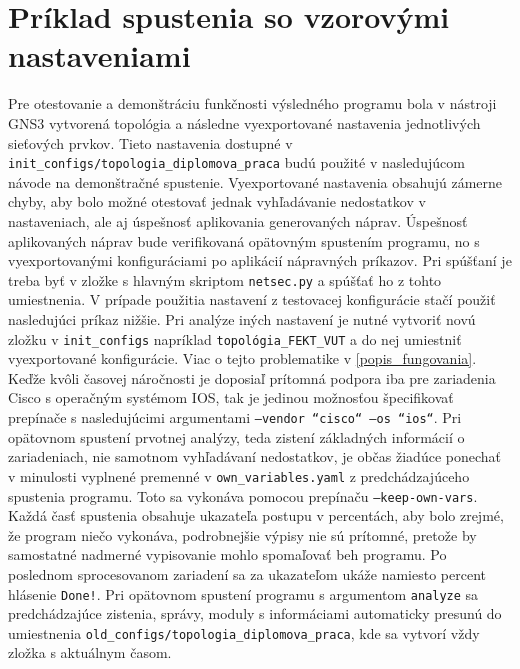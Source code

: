 \section{Príklad spustenia so vzorovými nastaveniami}
Pre otestovanie a demonštráciu funkčnosti výsledného programu bola v nástroji GNS3 vytvorená topológia a následne vyexportované nastavenia jednotlivých sieťových prvkov. Tieto nastavenia dostupné v \texttt{init\_configs/topologia\_diplomova\_praca} budú použité v nasledujúcom návode na demonštračné spustenie. Vyexportované nastavenia obsahujú zámerne chyby, aby bolo možné otestovať jednak vyhľadávanie nedostatkov v nastaveniach, ale aj úspešnosť aplikovania generovaných náprav. Úspešnosť aplikovaných náprav bude verifikovaná opätovným spustením programu, no s vyexportovanými konfiguráciami po aplikácií nápravných príkazov. Pri spúšťaní je treba byť v zložke s hlavným skriptom \texttt{netsec.py} a spúšťať ho z tohto umiestnenia. V prípade použitia nastavení z testovacej konfigurácie stačí použiť nasledujúci príkaz nižšie. Pri analýze iných nastavení je nutné vytvoriť novú zložku v \texttt{init\_configs} napríklad \texttt{topológia\_FEKT\_VUT} a do nej umiestniť vyexportované konfigurácie. Viac o tejto problematike v \ref{popis_fungovania}. Keďže kvôli časovej náročnosti je doposiaľ prítomná podpora iba pre zariadenia Cisco s operačným systémom IOS, tak je jedinou možnosťou špecifikovať prepínače s nasledujúcimi argumentami \texttt{---vendor ``cisco`` ---os ``ios``}. Pri opätovnom spustení prvotnej analýzy, teda zistení základných informácií o zariadeniach, nie samotnom vyhľadávaní nedostatkov, je občas žiadúce ponechať v minulosti vyplnené premenné v \texttt{own\_variables.yaml} z predchádzajúceho spustenia programu. Toto sa vykonáva pomocou prepínaču \texttt{---keep-own-vars}. Každá časť spustenia obsahuje ukazateľa postupu v percentách, aby bolo zrejmé, že program niečo vykonáva, podrobnejšie výpisy nie sú prítomné, pretože by samostatné nadmerné vypisovanie mohlo spomaľovať beh programu. Po poslednom sprocesovanom zariadení sa za ukazateľom ukáže namiesto percent hlásenie \texttt{Done!}. Pri opätovnom spustení programu s argumentom \texttt{analyze} sa predchádzajúce zistenia, správy, moduly s informáciami automaticky presunú do umiestnenia \texttt{old\_configs/topologia\_diplomova\_praca}, kde sa vytvorí vždy zložka s aktuálnym časom.

